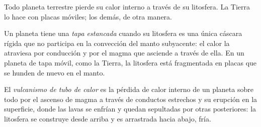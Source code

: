 Todo planeta terrestre pierde su calor interno a través de su litosfera.
La Tierra lo hace con placas móviles; los demás, de otra manera.

\begin{definition}\label{def:b3:planetary-interiors-surfaces:stagnant-lid}
Un planeta tiene una \emph{tapa estancada} cuando su litosfera
es una única cáscara rígida que no participa en la convección del
manto subyacente: el calor la atraviesa por conducción y por el magma que asciende
a través de ella. En un planeta de tapa móvil, como la Tierra, la litosfera está
fragmentada en placas que se hunden de nuevo en el manto.
\end{definition}

\begin{definition}\label{def:b3:planetary-interiors-surfaces:heat-pipe}
El \emph{vulcanismo de tubo de calor} es la pérdida de
calor interno de un planeta sobre todo por el ascenso de magma a través de conductos estrechos y
su erupción en la superficie, donde las lavas se enfrían y quedan sepultadas por otras
posteriores: la litosfera se construye desde arriba y es arrastrada hacia abajo, fría.
\end{definition}

